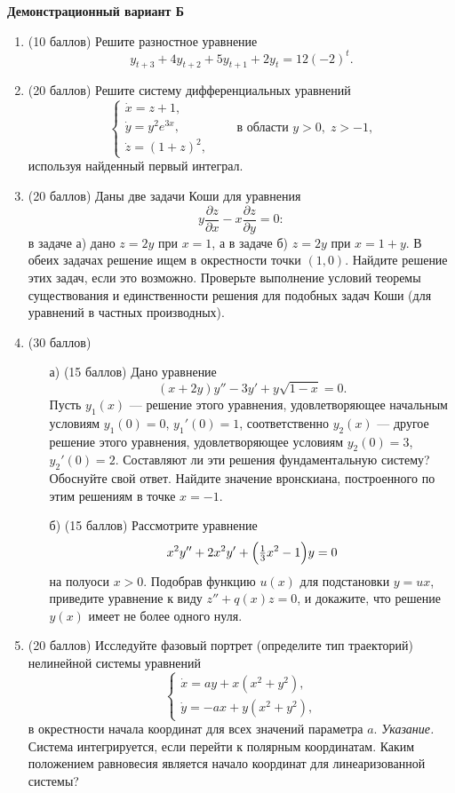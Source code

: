 \documentclass[12pt]{article}
\begin{document}
\begin{center}
\textbf{Демонстрационный вариант Б}
\end{center}

\begin{enumerate}
\item (10 баллов) Решите разностное уравнение
\[
y_{t+3}+4y_{t+2}+5y_{t+1}+2y_{t}=12(-2)^{t}.
\]

\item (20 баллов) Решите систему дифференциальных уравнений
\[
\begin{cases}
\dot{x}=z+1,\\[4pt]
\dot{y}=y^{2} e^{3x},\\[4pt]
\dot{z}=(1+z)^{2},
\end{cases}
\qquad
\text{в области } y>0,\; z>-1,
\]
используя найденный первый интеграл.

\item (20 баллов) Даны две задачи Коши для уравнения
\[
y \frac{\partial z}{\partial x}-x \frac{\partial z}{\partial y}=0:
\]
в задаче а) дано $z=2y$ при $x=1$, а в задаче б) $z=2y$ при $x=1+y$.
В обеих задачах решение ищем в окрестности точки $(1,0)$. Найдите решение этих задач, если это возможно. Проверьте выполнение условий теоремы существования и единственности решения для подобных задач Коши (для уравнений в частных производных).

\item (30 баллов)
\begin{enumerate}
\item[а) (15 баллов)] Дано уравнение
\[
(x+2y)y'' - 3y' + y\sqrt{1-x}=0.
\]
Пусть $y_{1}(x)$ — решение этого уравнения, удовлетворяющее начальным условиям $y_{1}(0)=0$, $y_{1}'(0)=1$, соответственно $y_{2}(x)$ — другое решение этого уравнения, удовлетворяющее условиям $y_{2}(0)=3$, $y_{2}'(0)=2$. Составляют ли эти решения фундаментальную систему? Обоснуйте свой ответ. Найдите значение вронскиана, построенного по этим решениям в точке $x=-1$.

\item[б) (15 баллов)] Рассмотрите уравнение
\[
x^{2}y''+2x^{2} y'+\Bigl(\tfrac{1}{3}x^{2}-1\Bigr)y=0
\]
на полуоси $x>0$. Подобрав функцию $u(x)$ для подстановки $y=ux$, приведите уравнение к виду $z''+q(x)z=0$, и докажите, что решение $y(x)$ имеет не более одного нуля.
\end{enumerate}

\item (20 баллов) Исследуйте фазовый портрет (определите тип траекторий) нелинейной системы уравнений
\[
\begin{cases}
\dot{x}=ay+x(x^{2}+y^{2}),\\[4pt]
\dot{y}=-ax+y(x^{2}+y^{2}),
\end{cases}
\]
в окрестности начала координат для всех значений параметра $a$.
\textit{Указание.} Система интегрируется, если перейти к полярным координатам. Каким положением равновесия является начало координат для линеаризованной системы?
\end{enumerate}
\end{document}
